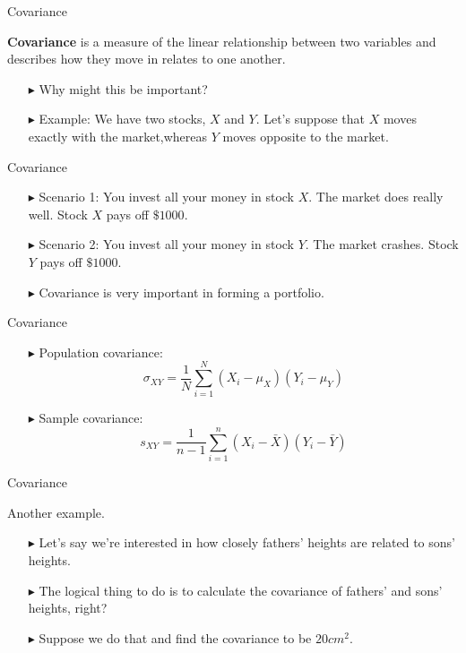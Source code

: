 \documentclass[12pt]{beamer}
\begin{document}
\begin{frame}{Covariance}
	
	{\bf Covariance} is a measure of the linear relationship between two variables and describes how they move in relates to one another.
	\begin{itemize}
		\item[$\blacktriangleright$] Why might this be important?
		\item[$\blacktriangleright$] Example: We have two stocks, $X$ and $Y$. Let's suppose that $X$ moves exactly with the market,whereas $Y$ moves opposite to the market.
	\end{itemize}
\end{frame}
\begin{frame}{Covariance}
	
	\begin{itemize}
		\item[$\blacktriangleright$] Scenario 1: You invest all your money in stock $X$. The market does really well. Stock $X$ pays off $\$1000$.
		\item[$\blacktriangleright$] Scenario 2: You invest all your money in stock $Y$. The market crashes. Stock $Y$ pays off $\$1000$.
		\item[$\blacktriangleright$] Covariance is very important in forming a portfolio.
	\end{itemize}
\end{frame}
\begin{frame}{Covariance}
	
	\begin{itemize}
		\item[$\blacktriangleright$] Population covariance:
		$$\sigma_{XY}=\frac{1}{N}\sum_{i=1}^N(X_i-\mu_X)(Y_i-\mu_Y)$$
		\item[$\blacktriangleright$] Sample covariance:
		$$s_{XY}=\frac{1}{n-1}\sum_{i=1}^n(X_i-\bar{X})(Y_i-\bar{Y})$$
	\end{itemize}
\end{frame}
\begin{frame}{Covariance}
	
	Another example.
	\begin{itemize}
		\item[$\blacktriangleright$] Let's say we're interested in how closely fathers' heights are related to sons' heights.
		\item[$\blacktriangleright$] The logical thing to do is to calculate the covariance of fathers' and sons' heights, right?
		\item[$\blacktriangleright$] Suppose we do that and find the covariance to be $20cm^2$.
	\end{itemize}
\end{frame}
\end{document}
